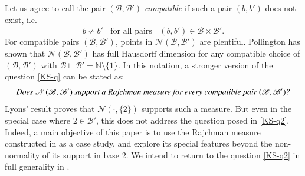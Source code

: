 \documentclass[12pt, twoside]{article}
\theoremstyle{definition}
\numberwithin{equation}{section}
\begin{document}
Let us agree to call the pair $(\mathscr{B}, \mathscr{B}')$ {\em{compatible}} if such a pair $(b, b')$ does not exist, i.e. 
\begin{equation}  b \not\sim b' \;\; \text{ for all pairs } \; \; (b,b') \in \overline{\mathscr{B}} \times \overline{\mathscr{B}'}. \label{compatibility-definition} \end{equation} For compatible pairs $(\mathscr{B}, \mathscr{B}')$, points in $\mathscr N(\mathscr{B}, \mathscr{B}')$ are plentiful. Pollington \cite{p81} has shown that $\mathscr N(\mathscr{B}, \mathscr{B}')$ has full Hausdorff dimension for any compatible choice of $(\mathscr{B}, \mathscr{B}')$ with $\mathscr{B} \sqcup \mathscr{B}' = \mathbb N \setminus \{1\}$. In this notation, a stronger version of the question \eqref{KS-q} can be stated as: \begin{equation} \label{KS-q2}
{\text{\em{Does $\mathscr N(\mathscr{B}, \mathscr{B}')$ support a Rajchman measure for every compatible pair $(\mathscr{B}, \mathscr{B}')$?}}} 
\end{equation} 
Lyons' result \cite{l86} proves that $\mathscr{N}(\cdot, \{2\})$ supports such a measure. But even in the special case where $2 \in \mathscr{B}'$, this does not address the question posed in \eqref{KS-q2}. Indeed, a main objective of this paper is to use the Rajchman measure constructed in \cite{l86} as a case study, and explore its special features beyond the non-normality of its support in base 2. We intend to return to the question \eqref{KS-q2} in full generality in \cite{PZ-2}. 
\end{document}
